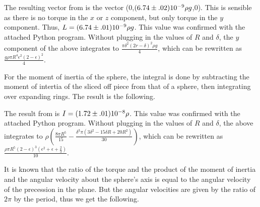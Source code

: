 \begin{paper}
\begin{paperwhere}
\end{paperwhere}

The resulting vector from \eqL is the vector (0,$(6.74\pm.02)\SI{E-9}{}\rho g$,0).
This is sensible as there is no torque in the $x$ or $z$ component, but only torque in the $y$ component.
Thus, $L=(6.74\pm.01)\SI{E-9}{}\rho g$.
This value was confirmed with the attached Python program.
Without plugging in the values of $R$ and $\delta$, the $y$ component of the above integrates to $\frac{\pi\delta^2(2r-\delta)^2\rho g}{4}$, which can be rewritten as $\frac{g\rho\pi R^4\epsilon^2(2-\epsilon)^2}{4}$.

For the moment of inertia of the sphere, the integral is done by subtracting the moment of intertia of the sliced off piece from that of a sphere, then integrating over expanding rings.
The result is the following.

\begin{paperwhere}
\end{paperwhere}

The result from \eqI is $I=(1.72\pm.01)\SI{E-8}{}\rho$.
This value was confirmed with the attached Python program.
Without plugging in the values of $R$ and $\delta$, the above integrates to $\rho\left(\frac{8\pi R^5}{15}-\frac{\delta^3\pi(3\delta^2-15\delta R+20R^2)}{30}\right)$, which can be rewritten as $\frac{\rho\pi R^5(2-\epsilon)^3(\epsilon^2+\epsilon+\frac23)}{10}$.

It is known that the ratio of the torque and the product of the moment of inertia and the angular velocity about the sphere's axis is equal to the angular velocity of the precession in the plane.
But the angular velocities are given by the ratio of $2\pi$ by the period, thus we get the following.

\begin{paperwhere}
\end{paperwhere}


\end{paper}
